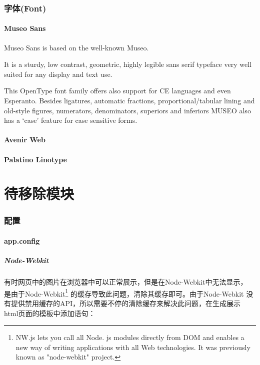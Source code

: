 \documentclass{book}
\begin{document}
\section{字体(Font)}

\subsection{Museo Sans}

Museo Sans is based on the well-known Museo.

It is a sturdy, low contrast, geometric, highly legible sans serif typeface very well suited for any display and text use.

This OpenType font family offers also support for CE languages and even Esperanto. Besides ligatures, automatic fractions, proportional/tabular lining and old-style figures, numerators, denominators, superiors and inferiors MUSEO also has a ‘case’ feature for case sensitive forms.

\subsection{Avenir Web}

\subsection{Palatino Linotype}



\part{待移除模块}
	
\clearpage
\mbox{}         
\clearpage

\section{配置}

\subsection{app.config}

\subsubsection{Node-Webkit}

有时网页中的图片在浏览器中可以正常展示，但是在Node-Webkit中无法显示，
是由于Node-Webkit\footnote{NW.js lets you call all Node.
js modules directly from DOM and enables a new way of 
writing applications with all Web technologies. 
It was previously known as "node-webkit" project.}
的缓存导致此问题，清除其缓存即可。由于Node-Webkit
没有提供禁用缓存的API，所以需要不停的清除缓存来解决此问题，在生成展示
html页面的模板中添加语句：
\end{document}
